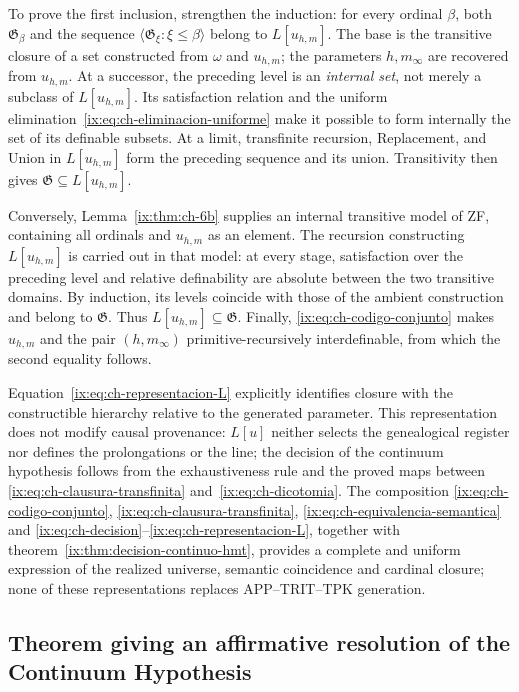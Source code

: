To prove the first inclusion, strengthen the induction: for every ordinal
\(\beta\), both \(\mathfrak G_\beta\) and the sequence
\(\langle\mathfrak G_\xi:\xi\leq\beta\rangle\) belong to \(L[u_{h,m}]\).
The base is the transitive closure of a set constructed from \(\omega\) and
\(u_{h,m}\); the parameters \(h,m_\infty\) are recovered from \(u_{h,m}\).
At a successor, the preceding level is an \emph{internal set}, not merely a
subclass of \(L[u_{h,m}]\). Its satisfaction relation and the uniform
elimination~\eqref{ix:eq:ch-eliminacion-uniforme} make it possible to form
internally the set of its definable subsets. At a limit, transfinite recursion,
Replacement, and Union in \(L[u_{h,m}]\) form the preceding sequence and its
union. Transitivity then gives \(\mathfrak G\subseteq L[u_{h,m}]\).

Conversely, Lemma~\ref{ix:thm:ch-6b} supplies an internal transitive model of ZF,
containing all ordinals and \(u_{h,m}\) as an element. The recursion
constructing \(L[u_{h,m}]\) is carried out in that model: at every stage,
satisfaction over the preceding level and relative definability are absolute
between the two transitive domains. By induction, its levels coincide with
those of the ambient construction and belong to \(\mathfrak G\). Thus
\(L[u_{h,m}]\subseteq\mathfrak G\). Finally,
\eqref{ix:eq:ch-codigo-conjunto} makes \(u_{h,m}\) and the pair
\((h,m_\infty)\) primitive-recursively interdefinable, from which the second
equality follows.

Equation~\eqref{ix:eq:ch-representacion-L} explicitly identifies
closure with the constructible hierarchy relative to the generated parameter. This
representation does not modify causal provenance: \(L[u]\) neither selects the
genealogical register nor defines the prolongations or the line; the decision of
the continuum hypothesis follows from the exhaustiveness rule and the proved maps between
\eqref{ix:eq:ch-clausura-transfinita} and~\eqref{ix:eq:ch-dicotomia}. The composition
\eqref{ix:eq:ch-codigo-conjunto}, \eqref{ix:eq:ch-clausura-transfinita},
\eqref{ix:eq:ch-equivalencia-semantica} and
\eqref{ix:eq:ch-decision}--\eqref{ix:eq:ch-representacion-L}, together with
theorem~\ref{ix:thm:decision-continuo-hmt}, provides a complete and
uniform expression of the realized universe, semantic coincidence and cardinal
closure; none of these representations replaces
APP--TRIT--TPK generation.

\subsection{Theorem giving an affirmative resolution of the Continuum Hypothesis}

